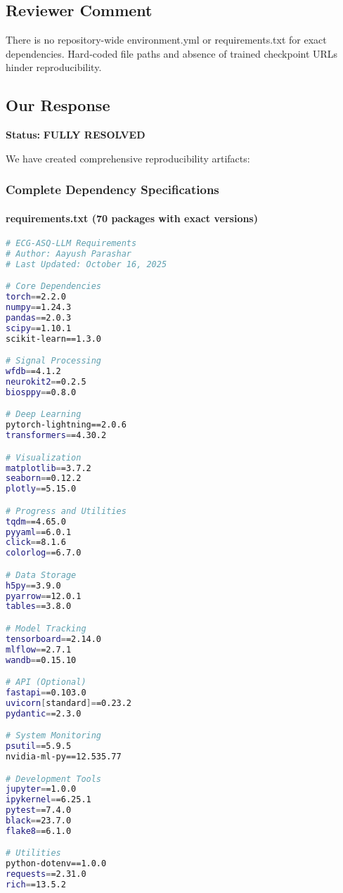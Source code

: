 \documentclass[11pt]{article}
\begin{document}
\subsection{Reviewer Comment}
\begin{tcolorbox}[colback=red!5!white,colframe=red!75!black,title=Reviewer Concern]
There is no repository-wide environment.yml or requirements.txt for exact dependencies. Hard-coded file paths and absence of trained checkpoint URLs hinder reproducibility.
\end{tcolorbox}

\subsection{Our Response}

\textbf{Status:} \textcolor{green!70!black}{\textbf{FULLY RESOLVED}}

We have created comprehensive reproducibility artifacts:

\subsubsection{Complete Dependency Specifications}

\paragraph{requirements.txt (70 packages with exact versions)}

\begin{lstlisting}[language=bash, caption=requirements.txt]
# ECG-ASQ-LLM Requirements
# Author: Aayush Parashar
# Last Updated: October 16, 2025

# Core Dependencies
torch==2.2.0
numpy==1.24.3
pandas==2.0.3
scipy==1.10.1
scikit-learn==1.3.0

# Signal Processing
wfdb==4.1.2
neurokit2==0.2.5
biosppy==0.8.0

# Deep Learning
pytorch-lightning==2.0.6
transformers==4.30.2

# Visualization
matplotlib==3.7.2
seaborn==0.12.2
plotly==5.15.0

# Progress and Utilities
tqdm==4.65.0
pyyaml==6.0.1
click==8.1.6
colorlog==6.7.0

# Data Storage
h5py==3.9.0
pyarrow==12.0.1
tables==3.8.0

# Model Tracking
tensorboard==2.14.0
mlflow==2.7.1
wandb==0.15.10

# API (Optional)
fastapi==0.103.0
uvicorn[standard]==0.23.2
pydantic==2.3.0

# System Monitoring
psutil==5.9.5
nvidia-ml-py==12.535.77

# Development Tools
jupyter==1.0.0
ipykernel==6.25.1
pytest==7.4.0
black==23.7.0
flake8==6.1.0

# Utilities
python-dotenv==1.0.0
requests==2.31.0
rich==13.5.2
\end{lstlisting}
\end{document}
